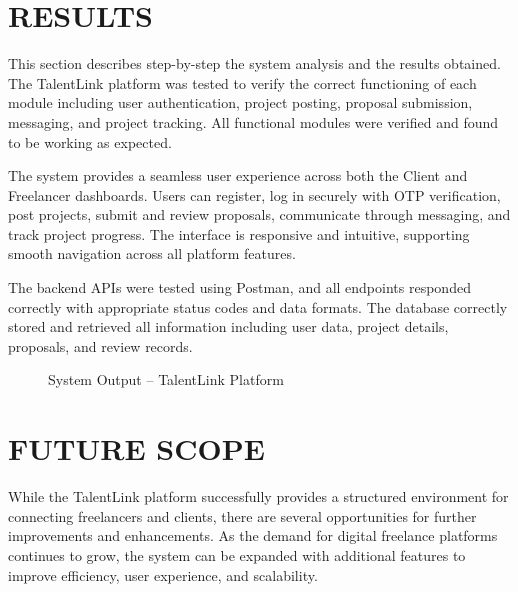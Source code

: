 \documentclass[12pt,a4paper,oneside]{report}
\numberwithin{figure}{chapter}
\numberwithin{table}{chapter}
\begin{document}
\chapter{RESULTS}

This section describes step-by-step the system analysis and the results obtained. The
TalentLink platform was tested to verify the correct functioning of each module including
user authentication, project posting, proposal submission, messaging, and project
tracking. All functional modules were verified and found to be working as expected.

\indent The system provides a seamless user experience across both the Client and
Freelancer dashboards. Users can register, log in securely with OTP verification, post
projects, submit and review proposals, communicate through messaging, and track project
progress. The interface is responsive and intuitive, supporting smooth navigation across
all platform features.

\indent The backend APIs were tested using Postman, and all endpoints responded correctly
with appropriate status codes and data formats. The database correctly stored and
retrieved all information including user data, project details, proposals, and review
records.

\begin{figure}[H]
  \centering
  \caption{System Output -- TalentLink Platform}
  \label{fig:output}
\end{figure}

\chapter{FUTURE SCOPE}

While the TalentLink platform successfully provides a structured environment for
connecting freelancers and clients, there are several opportunities for further
improvements and enhancements. As the demand for digital freelance platforms continues to
grow, the system can be expanded with additional features to improve efficiency, user
experience, and scalability.
\end{document}
